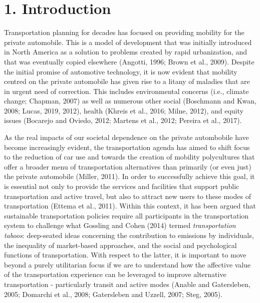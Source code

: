 \documentclass[]{elsarticle} %
\begin{document}
\hypertarget{introduction}{%
\section{1. Introduction}\label{introduction}}

Transportation planning for decades has focused on providing mobility
for the private automobile. This is a model of development that was
initially introduced in North America as a solution to problems created
by rapid urbanization, and that was eventually copied elsewhere
(Angotti, 1996; Brown et al., 2009). Despite the initial promise of
automotive technology, it is now evident that mobility centred on the
private automobile has given rise to a litany of maladies that are in
urgent need of correction. This includes environmental concerns (i.e.,
climate change; Chapman, 2007) as well as numerous other social
(Boschmann and Kwan, 2008; Lucas, 2019, 2012), health (Khreis et al.,
2016; Milne, 2012), and equity issues (Bocarejo and Oviedo, 2012;
Martens et al., 2012; Pereira et al., 2017).

As the real impacts of our societal dependence on the private
autombobile have become increasingly evident, the transportation agenda
has aimed to shift focus to the reduction of car use and towards the
creation of mobility polycultures that offer a broader menu of
transportation alternatives than primarily (or even just) the private
automobile (Miller, 2011). In order to successfully achieve this goal,
it is essential not only to provide the services and facilities that
support public transportation and active travel, but also to attract new
users to these modes of transportation (Ettema et al., 2011). Within
this context, it has been argued that sustainable transportation
policies require all participants in the transportation system to
challenge what Gossling and Cohen (2014) termed \emph{transportation
taboos}: deep-seated ideas concerning the contribution to emissions by
individuals, the inequality of market-based approaches, and the social
and psychological functions of transportation. With respect to the
latter, it is important to move beyond a purely utilitarian focus if we
are to understand how the affective value of the transportation
experience can be leveraged to improve alternative transportation -
particularly transit and active modes (Anable and Gatersleben, 2005;
Domarchi et al., 2008; Gatersleben and Uzzell, 2007; Steg, 2005).
\end{document}
